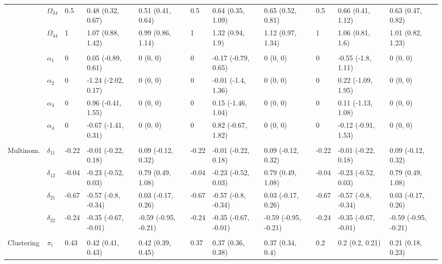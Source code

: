 \documentclass[]{article}
\begin{document}
\begin{landscape}
\begin{table}[t]
\begin{tabular}{lllllllllll}
\hspace{1em} & $\Omega_{34}$ & 0.5 & 0.48 (0.32, 0.67) & 0.51 (0.41, 0.64) & 0.5 & 0.64 (0.35, 1.09) & 0.65 (0.52, 0.81) & 0.5 & 0.66 (0.41, 1.12) & 0.63 (0.47, 0.82)\\
\hspace{1em} & $\Omega_{44}$ & 1 & 1.07 (0.88, 1.42) & 0.99 (0.86, 1.14) & 1 & 1.32 (0.94, 1.9) & 1.12 (0.97, 1.34) & 1 & 1.06 (0.81, 1.6) & 1.01 (0.82, 1.23)\\
\addlinespace[0.3em]
\multicolumn{11}{l}{\textbf{ }}\\
\hspace{1em} & $\alpha_{1}$ & 0 & 0.05 (-0.89, 0.61) & 0 (0, 0) & 0 & -0.17 (-0.79, 0.65) & 0 (0, 0) & 0 & -0.55 (-1.8, 1.11) & 0 (0, 0)\\
\hspace{1em} & $\alpha_{2}$ & 0 & -1.24 (-2.02, 0.17) & 0 (0, 0) & 0 & -0.01 (-1.4, 1.36) & 0 (0, 0) & 0 & 0.22 (-1.09, 1.95) & 0 (0, 0)\\
\hspace{1em} & $\alpha_{3}$ & 0 & 0.96 (-0.41, 1.55) & 0 (0, 0) & 0 & 0.15 (-1.46, 1.04) & 0 (0, 0) & 0 & 0.11 (-1.13, 1.08) & 0 (0, 0)\\
\hspace{1em} & $\alpha_{4}$ & 0 & -0.67 (-1.41, 0.31) & 0 (0, 0) & 0 & 0.82 (-0.67, 1.82) & 0 (0, 0) & 0 & -0.12 (-0.91, 1.53) & 0 (0, 0)\\
\addlinespace[0.3em]
\multicolumn{11}{l}{\textbf{ }}\\
\hspace{1em}Multinom. & $\delta_{11}$ & -0.22 & -0.01 (-0.22, 0.18) & 0.09 (-0.12, 0.32) & -0.22 & -0.01 (-0.22, 0.18) & 0.09 (-0.12, 0.32) & -0.22 & -0.01 (-0.22, 0.18) & 0.09 (-0.12, 0.32)\\
\hspace{1em} & $\delta_{12}$ & -0.04 & -0.23 (-0.52, 0.03) & 0.79 (0.49, 1.08) & -0.04 & -0.23 (-0.52, 0.03) & 0.79 (0.49, 1.08) & -0.04 & -0.23 (-0.52, 0.03) & 0.79 (0.49, 1.08)\\
\hspace{1em} & $\delta_{21}$ & -0.67 & -0.57 (-0.8, -0.34) & 0.03 (-0.17, 0.26) & -0.67 & -0.57 (-0.8, -0.34) & 0.03 (-0.17, 0.26) & -0.67 & -0.57 (-0.8, -0.34) & 0.03 (-0.17, 0.26)\\
\hspace{1em} & $\delta_{22}$ & -0.24 & -0.35 (-0.67, -0.01) & -0.59 (-0.95, -0.21) & -0.24 & -0.35 (-0.67, -0.01) & -0.59 (-0.95, -0.21) & -0.24 & -0.35 (-0.67, -0.01) & -0.59 (-0.95, -0.21)\\
\addlinespace[0.3em]
\multicolumn{11}{l}{\textbf{ }}\\
\hspace{1em}Clustering & $\pi_l$ & 0.43 & 0.42 (0.41, 0.43) & 0.42 (0.39, 0.45) & 0.37 & 0.37 (0.36, 0.38) & 0.37 (0.34, 0.4) & 0.2 & 0.2 (0.2, 0.21) & 0.21 (0.18, 0.23)\\
\bottomrule
\end{tabular}
\end{table}
\end{landscape}
\end{document}
